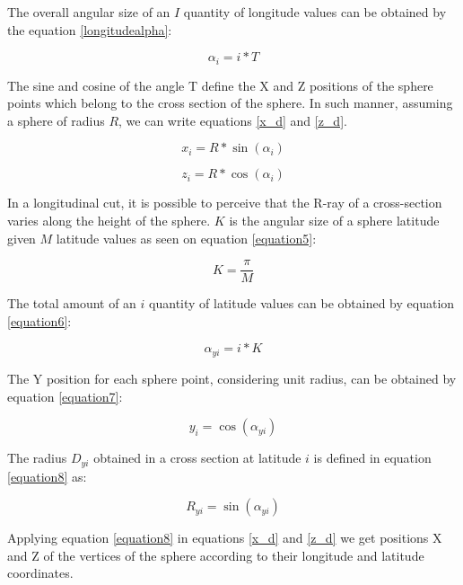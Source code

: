 \documentclass[12pt]{article}
\begin{document}
The overall angular size of an $I$ quantity of longitude values can be obtained by the equation \ref{longitudealpha}:

\begin{equation}
\alpha_{i} = i * T
\label{longitudealpha}
\end{equation}

The sine and cosine of the angle T define the X and Z positions of the sphere points which belong to the cross section of the sphere. In such manner, assuming a sphere of radius $R$, we can write equations \ref{x_d} and \ref{z_d}.

\begin{equation}
x_{i} = R * \sin(\alpha_{i})
\label{x_d}
\end{equation}

\begin{equation}
z_{i} = R * \cos(\alpha_{i})
\label{z_d}
\end{equation}

In a longitudinal cut, it is possible to perceive that the R-ray of a cross-section varies along the height of the sphere. $K$ is the angular size of a sphere latitude given $M$ latitude values as seen on equation \ref{equation5}:

\begin{equation}
K = \frac{\pi}{M}
\label{equation5}
\end{equation}

The total amount of an $i$ quantity of latitude values can be obtained by equation \ref{equation6}:

\begin{equation}
\alpha_{yi} = i * K
\label{equation6}
\end{equation}

The Y position for each sphere point, considering unit radius, can be obtained by equation \ref{equation7}:

\begin{equation}
y_{i} = \cos(\alpha_{yi})
\label{equation7}
\end{equation}

The radius $D_{yi}$ obtained in a cross section at latitude $i$ is defined in equation \ref{equation8} as:

\begin{equation}
R_{yi} = \sin(\alpha_{yi})
\label{equation8}
\end{equation}

Applying equation \ref{equation8} in equations \ref{x_d} and \ref{z_d} we get  positions X and Z of the vertices of the sphere according to their longitude and latitude coordinates.
\end{document}
